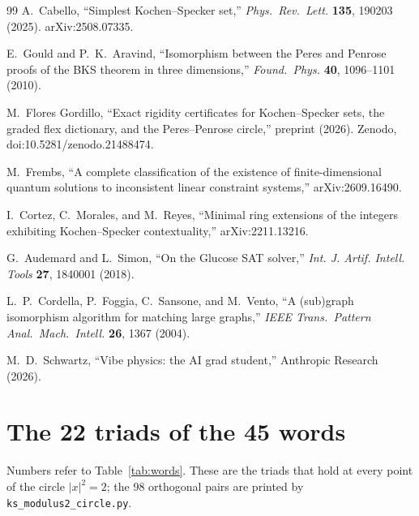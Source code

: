 \documentclass[11pt,a4paper]{article}
\theoremstyle{definition}
\theoremstyle{remark}
\begin{document}
\begin{thebibliography}{99}
A.~Cabello, ``Simplest Kochen--Specker set,''
\textit{Phys.\ Rev.\ Lett.} \textbf{135}, 190203 (2025).  arXiv:2508.07335.

E.~Gould and P.~K.~Aravind,
``Isomorphism between the Peres and Penrose proofs of the BKS theorem in three dimensions,''
\textit{Found.\ Phys.} \textbf{40}, 1096--1101 (2010).

M.~Flores Gordillo,
``Exact rigidity certificates for Kochen--Specker sets, the graded flex dictionary, and the
Peres--Penrose circle,'' preprint (2026).  Zenodo, doi:10.5281/zenodo.21488474.

M.~Frembs, ``A complete classification of the existence of finite-dimensional quantum solutions
to inconsistent linear constraint systems,'' arXiv:2609.16490.

I.~Cortez, C.~Morales, and M.~Reyes,
``Minimal ring extensions of the integers exhibiting Kochen--Specker contextuality,''
arXiv:2211.13216.

G.~Audemard and L.~Simon, ``On the Glucose SAT solver,''
\textit{Int. J. Artif. Intell. Tools} \textbf{27}, 1840001 (2018).

L.~P.~Cordella, P.~Foggia, C.~Sansone, and M.~Vento,
``A (sub)graph isomorphism algorithm for matching large graphs,''
\textit{IEEE Trans.\ Pattern Anal.\ Mach.\ Intell.} \textbf{26}, 1367 (2004).

M.~D.~Schwartz, ``Vibe physics: the AI grad student,'' Anthropic Research (2026).

\end{thebibliography}

\appendix
\section{The 22 triads of the 45 words}\label{app:triads}
Numbers refer to Table~\ref{tab:words}.  These are the triads that hold at every point of the
circle $|x|^2=2$; the 98 orthogonal pairs are printed by \texttt{ks\_modulus2\_circle.py}.

\smallskip\noindent\raggedright

\end{document}
